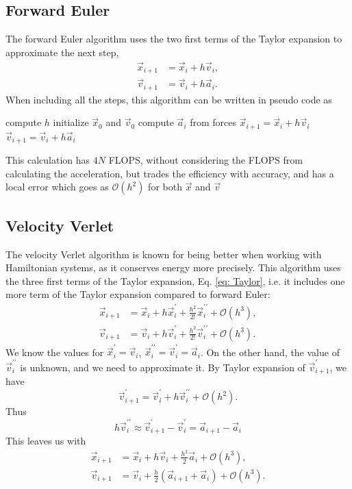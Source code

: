 \documentclass[%
 reprint,
nofootinbib,
aps,
]{revtex4-1}
\begin{document}
\subsection{Forward Euler}
The forward Euler algorithm uses the two first terms of the Taylor expansion to approximate the next step,
\begin{align}
\vec{x}_{i+1} &= \vec{x}_i + h \vec{v}_i,\\
\vec{v}_{i+1} &= \vec{v}_i + h \vec{a}_i.
\end{align}
When including all the steps, this algorithm can be written in pseudo code as
\begin{algorithmic}[H]
\State compute $h$
\State initialize $\vec{x}_0$ and $\vec{v}_0$
	\State compute $\vec{a}_i$ from forces
	\State $\vec{x}_{i+1} = \vec{x}_i + h \vec{v}_i$
	\State $\vec{v}_{i+1} = \vec{v}_i + h \vec{a}_i$
\EndFor
\State
\end{algorithmic}
This calculation has $4N$ FLOPS, without considering the FLOPS from calculating the acceleration, but trades the efficiency with accuracy, and has a local error which goes as $\mathcal{O}(h^2)$ for both $\vec{x}$ and $\vec{v}$


\subsection{Velocity Verlet}

The velocity Verlet algorithm is known for being better when working with Hamiltonian systems, as it conserves energy more precisely. This algorithm uses the three first terms of the Taylor expansion, Eq. \eqref{eq: Taylor}, i.e. it includes one more term of the Taylor expansion compared to forward Euler:
\begin{align}
\vec{x}_{i+1} &= \vec{x}_i + h\vec{x}_i^{\prime} + \frac{h^2}{2!}\vec{x}_i^{\prime\prime} + \mathcal{O}(h^3),\\
\vec{v}_{i+1} &= \vec{v}_i + h\vec{v}_i^{\prime} + \frac{h^2}{2!}\vec{v}_i^{\prime\prime} + \mathcal{O}(h^3).
\end{align}
We know the values for $\vec{x}_i^{\prime} = \vec{v}_i$, $\vec{x}_i^{\prime\prime} = \vec{v}_i^{\prime} = \vec{a}_i$. On the other hand, the value of $\vec{v}_i^{\prime\prime}$ is unknown, and we need to approximate it.
By Taylor expansion of $\vec{v}_{i+1}^{\prime}$, we have
\begin{equation}
\vec{v}_{i+1}^{\prime} = \vec{v}_i^{\prime} + h\vec{v}_i^{\prime\prime} + \mathcal{O}(h^2).
\end{equation}
Thus
\begin{equation}
h\vec{v}_i^{\prime \prime} \approx \vec{v}^{\prime}_{i+1} - \vec{v}_i^{\prime} = \vec{a}_{i+1} - \vec{a}_i
\end{equation}
This leaves us with
\begin{align}
\vec{x}_{i+1} &= \vec{x}_i + h\vec{v}_i + \frac{h^2}{2}\vec{a}_i + \mathcal{O}(h^3),\\
\vec{v}_{i+1} &= \vec{v}_i + \frac{h}{2}\left( \vec{a}_{i+1} + \vec{a}_i \right) + \mathcal{O}(h^3).
\end{align}
\end{document}
